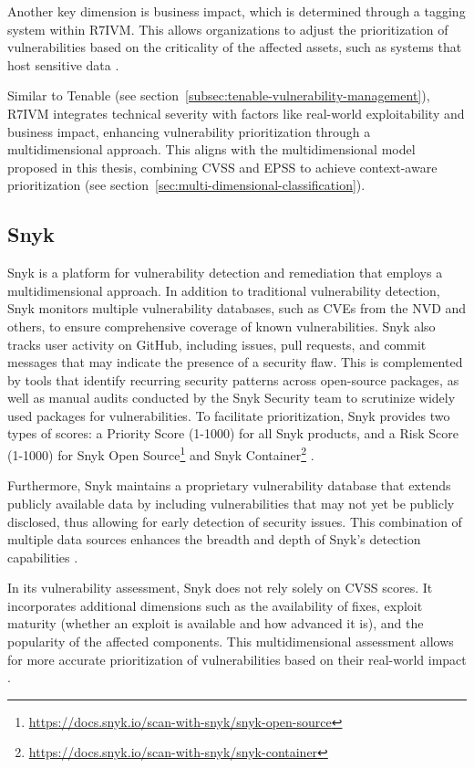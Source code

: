 Another key dimension is business impact, which is determined through a tagging system within \ac{R7IVM}. This allows organizations to adjust the prioritization of vulnerabilities based on the criticality of the affected assets, such as systems that host sensitive data \autocite{rapid7_live_2017}.

Similar to Tenable (see section~\ref{subsec:tenable-vulnerability-management}), \ac{R7IVM} integrates technical severity with factors like real-world exploitability and business impact, enhancing vulnerability prioritization through a multidimensional approach. This aligns with the multidimensional model proposed in this thesis, combining \ac{CVSS} and \ac{EPSS} to achieve context-aware prioritization (see section~\ref{sec:multi-dimensional-classification}).

\subsection{Snyk}
\label{subsec:snyk}

Snyk is a platform for vulnerability detection and remediation that employs a multidimensional approach. In addition to traditional vulnerability detection, Snyk monitors multiple vulnerability databases, such as \ac{CVE}s from the \ac{NVD} and others, to ensure comprehensive coverage of known vulnerabilities. Snyk also tracks user activity on GitHub, including issues, pull requests, and commit messages that may indicate the presence of a security flaw. This is complemented by tools that identify recurring security patterns across open-source packages, as well as manual audits conducted by the Snyk Security team to scrutinize widely used packages for vulnerabilities. To facilitate prioritization, Snyk provides two types of scores: a Priority Score (1-1000) for all Snyk products, and a Risk Score (1-1000) for Snyk Open Source\footnote{\url{https://docs.snyk.io/scan-with-snyk/snyk-open-source}} and Snyk Container\footnote{\url{https://docs.snyk.io/scan-with-snyk/snyk-container}} \autocite{snyk_limited_priority_2024, snyk_limited_risk_2024}.

Furthermore, Snyk maintains a proprietary vulnerability database that extends publicly available data by including vulnerabilities that may not yet be publicly disclosed, thus allowing for early detection of security issues. This combination of multiple data sources enhances the breadth and depth of Snyk’s detection capabilities \autocite{snyk_limited_snyk_2024}.

In its vulnerability assessment, Snyk does not rely solely on \ac{CVSS} scores. It incorporates additional dimensions such as the availability of fixes, exploit maturity (whether an exploit is available and how advanced it is), and the popularity of the affected components. This multidimensional assessment allows for more accurate prioritization of vulnerabilities based on their real-world impact \autocite{snyk_limited_vier_2024}.

